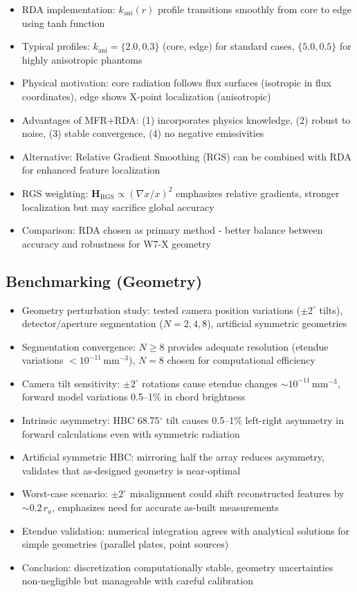 \documentclass[11pt,a4paper]{article}
\begin{document}
\begin{itemize}
\item RDA implementation: $k_{\text{ani}}(r)$ profile transitions smoothly from core to edge using tanh function
\item Typical profiles: $k_{\text{ani}}=\{2.0, 0.3\}$ (core, edge) for standard cases, $\{5.0, 0.5\}$ for highly anisotropic phantoms
\item Physical motivation: core radiation follows flux surfaces (isotropic in flux coordinates), edge shows X-point localization (anisotropic)
\item Advantages of MFR+RDA: (1) incorporates physics knowledge, (2) robust to noise, (3) stable convergence, (4) no negative emissivities
\item Alternative: Relative Gradient Smoothing (RGS) can be combined with RDA for enhanced feature localization
\item RGS weighting: $\mathbf{H}_{\text{RGS}} \propto (\nabla x/x)^2$ emphasizes relative gradients, stronger localization but may sacrifice global accuracy
\item Comparison: RDA chosen as primary method - better balance between accuracy and robustness for W7-X geometry
\end{itemize}

\subsection{Benchmarking (Geometry)}

\begin{itemize}
\item Geometry perturbation study: tested camera position variations ($\pm2^\circ$ tilts), detector/aperture segmentation ($N=2,4,8$), artificial symmetric geometries
\item Segmentation convergence: $N\geq8$ provides adequate resolution (etendue variations $<10^{-11}$\,mm$^{-3}$), $N=8$ chosen for computational efficiency
\item Camera tilt sensitivity: $\pm2^\circ$ rotations cause etendue changes $\sim10^{-11}$\,mm$^{-3}$, forward model variations 0.5--1\% in chord brightness
\item Intrinsic asymmetry: HBC 68.75$^\circ$ tilt causes 0.5--1\% left-right asymmetry in forward calculations even with symmetric radiation
\item Artificial symmetric HBC: mirroring half the array reduces asymmetry, validates that as-designed geometry is near-optimal
\item Worst-case scenario: $\pm2^\circ$ misalignment could shift reconstructed features by $\sim$0.2\,$r_a$, emphasizes need for accurate as-built measurements
\item Etendue validation: numerical integration agrees with analytical solutions for simple geometries (parallel plates, point sources)
\item Conclusion: discretization computationally stable, geometry uncertainties non-negligible but manageable with careful calibration
\end{itemize}
\end{document}
